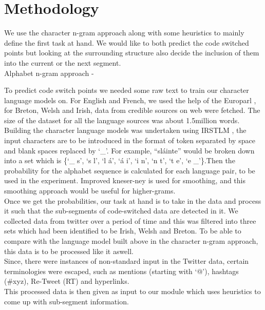 \documentclass[11pt]{article}
\begin{document}
\section{Methodology}
\label{sec:method}
We use the character n-gram approach along with some heuristics to mainly define the first task at hand. We would like to both predict the code switched points but looking at the surrounding structure also decide the inclusion of them into the current or the next segment. \\


Alphabet n-gram approach - 

To predict code switch points we needed some raw text to train our character language models on. For English and French, we used the help of the Europarl \cite{koehn2005europarl}, for Breton, Welsh and Irish, data from credible sources on web were fetched. The size of the dataset for all the language sources was about 1.5million words. \\
Building the character language models was undertaken using IRSTLM \cite{federico08a}, the input characters are to be introduced in the format of token separated by space and blank spaces replaced by ‘_’. For example, “sláinte” would be broken down into a set which is \{‘_ s’, ‘s l’, ‘l á’, ‘á i’, ‘i n’, ‘n t’, ‘t e’, ‘e _’\}.Then the probability for the alphabet sequence is calculated for each language pair, to be used in the experiment. Improved kneser-ney is used for smoothing, and this smoothing approach would be useful for higher-grams. \cite{kneser1995improved} \\

Once we get the probabilities, our task at hand is to take in the data and process it such that the  sub-segments of code-switched data are detected in it. We collected data from twitter over a period of time and this was filtered into three sets which had been identified to be Irish, Welsh and Breton. To be able to compare with the language model built above in the character n-gram approach, this data is to be processed like it aswell. \\

Since, there were instances of non-standard input in the Twitter data, certain terminologies were escaped, such as mentions (starting with ‘@’), hashtags (#xyz), Re-Tweet (RT) and hyperlinks.\\
This processed data is then given as input to our module which uses heuristics to come up with sub-segment information. \\
\end{document}
